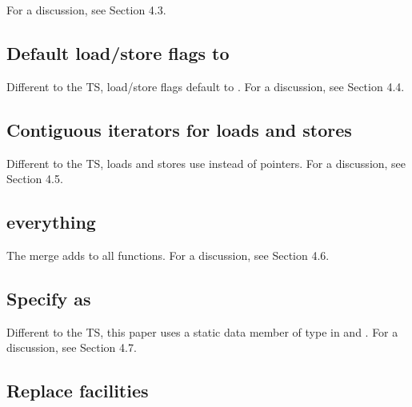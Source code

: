 For a discussion, see  Section 4.3.

\subsection{Default load/store flags to }

Different to the TS, load/store flags default to .
For a discussion, see  Section 4.4.

\subsection{Contiguous iterators for loads and stores}\label{sec:contiguousItLoadStore}

Different to the TS, loads and stores use  instead of pointers.
For a discussion, see  Section 4.5.

\subsection{ everything}
The merge adds  to all functions.
For a discussion, see  Section 4.6.

\subsection{Specify  as }

Different to the TS, this paper uses a static data member  of type
\std{} in \simd and \mask.
For a discussion, see  Section 4.7.

\subsection{Replace  facilities}

